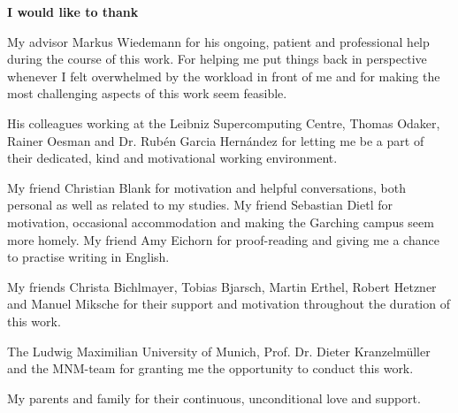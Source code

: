 \vspace*{2cm}

   \textbf{I would like to thank}


\vspace*{1cm}

My advisor Markus Wiedemann for his ongoing, patient and professional help during the course of this work. For helping me put things back in perspective whenever I felt overwhelmed by the workload in front of me and for making the most challenging aspects of this work seem feasible.


\vspace*{1cm}
His colleagues working at the Leibniz Supercomputing Centre, Thomas Odaker, Rainer Oesman and Dr. Rub\'{e}n Garcia Hern\'{a}ndez for letting me be a part of their dedicated, kind and motivational working environment.


\vspace*{1cm}
My friend Christian Blank for motivation and helpful conversations, both personal as well as related to my studies. My friend Sebastian Dietl for motivation, occasional accommodation and making the Garching campus seem more homely. My friend Amy Eichorn for proof-reading and giving me a chance to practise writing in English.


\vspace*{1cm}
My friends Christa Bichlmayer, Tobias Bjarsch, Martin Erthel, Robert Hetzner and Manuel Miksche for their support and motivation throughout the duration of this work.


\vspace*{1cm}
The Ludwig Maximilian University of Munich, Prof. Dr. Dieter Kranzelm\"uller and the MNM-team for granting me the opportunity to conduct this work.


\vspace*{1cm}
My parents and family for their continuous, unconditional love and support.
